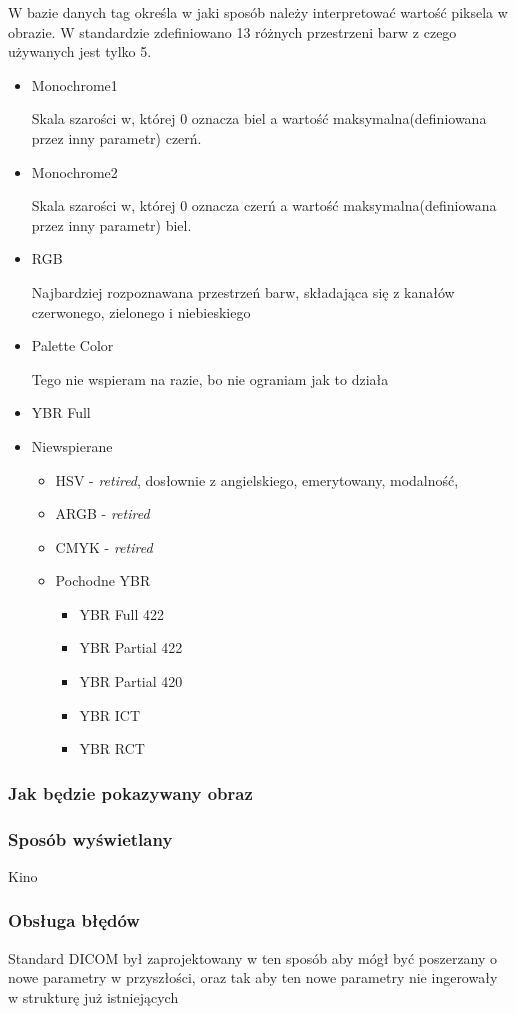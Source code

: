 W bazie danych tag  określa w jaki sposób należy interpretować wartość piksela w obrazie.
W standardzie zdefiniowano 13 różnych przestrzeni barw  z czego używanych jest tylko 5.

\begin{itemize}
    \item Monochrome1

    Skala szarości w, której 0 oznacza biel a wartość maksymalna(definiowana przez inny parametr) czerń.

    \item Monochrome2

    Skala szarości w, której 0 oznacza czerń a wartość maksymalna(definiowana przez inny parametr) biel.

    \item RGB

    Najbardziej rozpoznawana przestrzeń barw, składająca się z kanałów czerwonego, zielonego i niebieskiego

    \item Palette Color

    Tego nie wspieram na razie, bo nie ograniam jak to działa

    \item YBR Full


    \item Niewspierane
    \begin{itemize}
        \item HSV - \textit{retired}, dosłownie z angielskiego, emerytowany, modalność,
        \item ARGB - \textit{retired}
        \item CMYK - \textit{retired}
        \item Pochodne YBR
        \begin{itemize}
            \item YBR Full 422
            \item YBR Partial 422
            \item YBR Partial 420
            \item YBR ICT
            \item YBR RCT 
        \end{itemize}
    \end{itemize}

\end{itemize}

\subsubsection{Jak będzie pokazywany obraz}

\subsubsection{Sposób wyświetlany}

Kino

\subsubsection{Obsługa błędów}

Standard DICOM był zaprojektowany w ten sposób aby mógł być poszerzany o nowe parametry w przyszłości, oraz tak aby ten nowe parametry nie ingerowały w strukturę już istniejących
